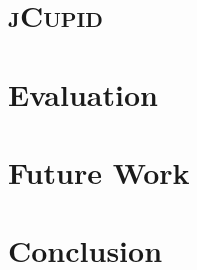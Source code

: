 \documentclass{llncs}
\begin{document}
\section{\textsc{jCupid}}
\label{sec:jcupid}


\section{Evaluation}
\label{sec:evaluation}


\section{Future Work}
\label{sec:future}


\section{Conclusion}
\label{sec:conclusion}






\newpage
\appendix

\end{document}
